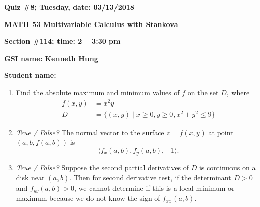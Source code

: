 \documentclass{article}
\begin{document}
{\bf Quiz \#8; Tuesday, date: 03/13/2018}

{\bf MATH 53 Multivariable Calculus with Stankova}

{\bf Section \#114; time: 2 -- 3:30 pm}

{\bf GSI name: Kenneth Hung}

{\bf Student name:}

\vspace*{0.25in}

\begin{enumerate}
\item Find the absolute maximum and minimum values of $f$ on the set $D$, where
\begin{align*}
f(x, y) & = x^2 y \\
D & = \{(x, y) \;|\; x \ge 0, y \ge 0, x^2 + y^2 \le 9\}
\end{align*}

\item {\em True / False?} The normal vector to the surface $z = f(x, y)$ at point $(a, b, f(a, b))$ is
\[
\langle f_x(a, b), f_y(a, b), -1\rangle.
\]

\item {\em True / False?} Suppose the second partial derivatives of $D$ is continuous on a disk near $(a, b)$. Then for second derivative test, if the determinant $D > 0$ and $f_{yy}(a, b) > 0$, we cannot determine if this is a local minimum or maximum because we do not know the sign of $f_{xx}(a, b)$.
\end{enumerate}
\end{document}
